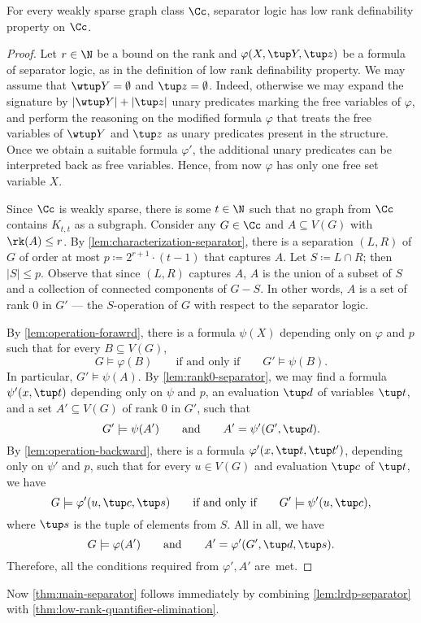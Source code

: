 \begin{lemma}\label{lem:lrdp-separator}
 For every weakly sparse graph class $\Cc$, separator logic has low rank definability property on $\Cc$.
\end{lemma}
\begin{proof}
 Let $r\in \N$ be a bound on the rank and $\varphi(X,\tup Y,\tup z)$ be a formula of separator logic, as in the definition of low rank definability property. We may assume that $\wtup Y=\emptyset$ and $\tup z=\emptyset$.
 Indeed, otherwise we may expand the signature by $|\wtup Y|+|\tup z|$ unary predicates marking the free variables of $\varphi$, and perform the reasoning on the modified formula $\varphi$ that treats the free variables of $\wtup Y$ and $\tup z$ as unary predicates present in the structure.
 Once we obtain a suitable formula $\varphi'$, the additional unary predicates can be interpreted back as free variables.
 Hence, from now $\varphi$ has only one free set variable $X$.

 Since $\Cc$ is weakly sparse, there is some $t\in \N$ such that no graph from $\Cc$ contains $K_{t,t}$ as a subgraph. Consider any $G\in \Cc$ and $A\subseteq V(G)$ with $\rk(A)\leq r$. By \cref{lem:characterization-separator}, there is a separation $(L,R)$ of $G$ of order at most $p\coloneqq 2^{r+1}\cdot (t-1)$ that captures $A$. Let $S\coloneqq L\cap R$; then $|S|\leq p$. Observe that since $(L,R)$ captures $A$, $A$ is the union of a subset of $S$ and a collection of connected components of $G-S$. In other words, $A$ is a set of rank $0$ in $G'$ --- the $S$-operation of $G$ with respect to the separator logic.

 By \cref{lem:operation-forawrd}, there is a formula $\psi(X)$ depending only on $\varphi$ and $p$ such that for every $B\subseteq V(G)$,
 \[G\models \varphi(B)\qquad\textrm{if and only if}\qquad G'\models \psi(B).\]
 In particular, $G'\models \psi(A)$. By \cref{lem:rank0-separator}, we may find a formula $\psi'(x,\tup t)$ depending only on $\psi$ and $p$, an evaluation $\tup d$ of variables $\tup t$, and a set $A'\subseteq V(G)$ of rank $0$ in $G'$, such that
 \[G'\models \psi(A')\qquad \textrm{and}\qquad A'=\psi'(G',\tup d).\]
 By \cref{lem:operation-backward}, there is a formula $\varphi'(x,\tup t,\tup t')$, depending only on $\psi'$ and $p$, such that for every $u\in V(G)$ and evaluation $\tup c$ of $\tup t$, we have
 \[G\models \varphi'(u,\tup c, \tup s)\qquad \textrm{if and only if}\qquad G'\models \psi'(u,\tup c),\]
 where $\tup s$ is the tuple of elements from $S$.
 All in all, we have
 \[G\models \varphi(A')\qquad \textrm{and}\qquad A'=\varphi'(G',\tup d, \tup s).\]
 Therefore, all the conditions required from $\varphi',A'$ are~met.
\end{proof}


Now \cref{thm:main-separator} follows immediately by combining \cref{lem:lrdp-separator} with \cref{thm:low-rank-quantifier-elimination}.
